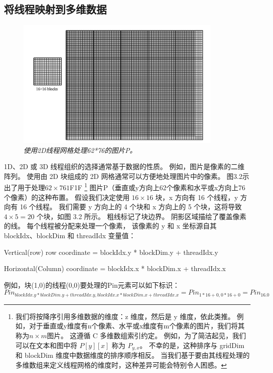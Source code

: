 \subsection{将线程映射到多维数据}
\begin{figure}[H]
	\centering
	\includegraphics[width=0.9\textwidth]{figs/F3.2.png}
	\caption{\textit{使用2D线程网格处理62*76的图片P。}}
\end{figure}

1D、2D 或 3D 线程组织的选择通常基于数据的性质。 例如，图片是像素的二维阵列。 
使用由 2D 块组成的 2D 网格通常可以方便地处理图片中的像素。 
图3.2示出了用于处理$62 \times 761$F1F
\footnote{我们将按降序引用多维数据的维度：z 维度，然后是 y 维度，依此类推。 
例如，对于垂直或y维度有n个像素、水平或x维度有m个像素的图片，我们将其称为$n \times m$图片。 
这遵循 C 多维数组索引约定。 例如，为了简洁起见，我们可以在文本和图中将 $P[y][x]$ 称为 $P_{y,x}$。 
不幸的是，这种排序与 gridDim 和 blockDim 维度中数据维度的排序顺序相反。 
当我们基于要由其线程处理的多维数组来定义线程网格的维度时，这种差异可能会特别令人困惑。}
图片P（垂直或y方向上62个像素和水平或x方向上76个像素）的这种布置。 
假设我们决定使用 $16 \times 16$ 块，x 方向有 16 个线程，y 方向有 16 个线程。 
我们需要 y 方向上的 4 个块和 x 方向上的 5 个块，这将导致 $4 \times 5 = 20$ 个块，如图 3.2 所示。 
粗线标记了块边界。 阴影区域描绘了覆盖像素的线。 每个线程被分配来处理一个像素，
该像素的 y 和 x 坐标源自其 blockIdx、blockDim 和 threadIdx 变量值：

Vertical(row) row coordinate = blockIdx.y * blockDim.y + threadIdx.y

Horizontal(Column) coordinate = blockIdx.x * blockDim.x + threadIdx.x

例如，块(1,0)的线程(0,0)要处理的Pin元素可以如下标识：
$$
Pin_{blockIdx.y*blockDim.y+threadIdx.y, blockIdx.x*blockDim.x+threadIdx.x} = Pin_{1*16+0,0*16+0} = Pin_{16.0}
$$

